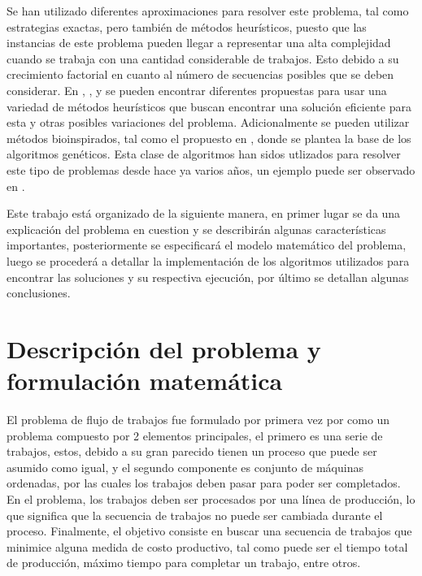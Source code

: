 \documentclass[10pt, twoside]{article}
\begin{document}
Se han utilizado diferentes aproximaciones para resolver este problema, tal como
estrategias exactas, pero también de métodos heurísticos, puesto que las
instancias de este problema pueden llegar a representar una alta complejidad
cuando se trabaja con una cantidad considerable de trabajos. Esto debido a su
crecimiento factorial en cuanto al número de secuencias posibles que se deben
considerar. En \cite{heuristico4}, \cite{heuristico1}, \cite{heuristico2} y
\cite{heuristico3} se pueden encontrar diferentes propuestas para usar una
variedad de métodos heurísticos que buscan encontrar una solución eficiente
para esta y otras posibles variaciones del problema. Adicionalmente se
pueden utilizar métodos bioinspirados, tal como el propuesto en \cite{genetic1},
donde se plantea la base de los algoritmos genéticos. Esta clase de algoritmos
han sidos utlizados para resolver este tipo de problemas desde hace ya varios
años, un ejemplo puede ser observado en \cite{genetic3}.

\newpage

Este trabajo está organizado de la siguiente manera, en primer lugar
se da una explicación del problema en cuestion y se describirán algunas
características importantes, posteriormente se especificará el modelo
matemático del problema, luego se procederá a detallar la implementación de los
algoritmos utilizados para encontrar las soluciones y su respectiva ejecución,
por último se detallan algunas conclusiones.

\section{Descripción del problema y formulación matemática}

El problema de flujo de trabajos fue formulado por primera vez por \cite{original}
como un problema compuesto por 2 elementos principales, el primero es una serie
de trabajos, estos, debido a su gran parecido tienen un proceso que puede ser
asumido como igual, y el segundo componente es conjunto de máquinas ordenadas,
por las cuales los trabajos deben pasar para poder ser completados. En el problema,
los trabajos deben ser procesados por una línea de producción, lo que significa
que la secuencia de trabajos no puede ser cambiada durante el proceso.
Finalmente, el objetivo consiste en buscar una secuencia de trabajos que
minimice alguna medida de costo productivo, tal como puede ser el tiempo total
de producción, máximo tiempo para completar un trabajo, entre otros.\\
\end{document}
